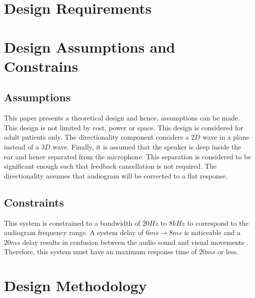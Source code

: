 \documentclass[11pt,onecolumn]{witseiepaper}
\begin{document}
\section{Design Requirements}


\section{Design Assumptions and Constrains}

\subsection{Assumptions}

\noindent This paper presents a theoretical design and hence, assumptions can be made. This design is not limited by cost, power or space. This design is considered for adult patients only. The directionality component considers a $2D$ wave in a plane instead of a $3D$ wave. Finally, it is assumed that the speaker is deep inside the ear and hence separated from the microphone. This separation is considered to be significant enough such that feedback cancellation is not required. The directionality assumes that audiogram will be corrected to a flat response.

\subsection{Constraints}

\noindent This system is constrained to a bandwidth of $20Hz$ to $8kHz$ to correspond to the audiogram frequency range. A system delay of $6ms \rightarrow 8ms$ is noticeable and a $20ms$ delay results in confusion between the audio sound and visual movements \cite{brennan}. Therefore, this system must have an maximum response time of $20ms$ or less. 

\section{Design Methodology}
\end{document}
